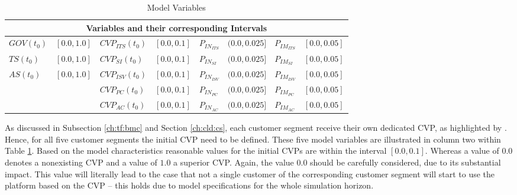 \begin{table}[t]
	\centering
	\begin{tabular}{llllllll}
		\toprule 
		\multicolumn{8}{c}{\footnotesize \textbf{Variables and their corresponding Intervals}} \\ \midrule
		\footnotesize $GOV(t_0)$ & \footnotesize $[0.0,1.0]$ & \footnotesize $CVP_{ITS}(t_0)$ & \footnotesize $[0.0,0.1]$ & \footnotesize $P_{IN_{ITS}}$ & \footnotesize $(0.0,0.025]$ & \footnotesize $P_{IM_{ITS}}$ & \footnotesize $[0.0,0.05]$ \\
		\footnotesize $TS(t_0)$ & \footnotesize $[0.0,1.0]$ & \footnotesize $CVP_{SI}(t_0)$ & \footnotesize $[0.0,0.1]$ & \footnotesize $P_{IN_{SI}}$ & \footnotesize $(0.0,0.025]$ & \footnotesize $P_{IM_{SI}}$ & \footnotesize $[0.0,0.05]$ \\
		\footnotesize $AS(t_0)$ & \footnotesize $[0.0,1.0]$ & \footnotesize $CVP_{ISV}(t_0)$ & \footnotesize $[0.0,0.1]$ & \footnotesize $P_{IN_{ISV}}$ & \footnotesize $(0.0,0.025]$ & \footnotesize $P_{IM_{ISV}}$ & \footnotesize $[0.0,0.05]$ \\
		& & \footnotesize $CVP_{PC}(t_0)$ & \footnotesize $[0.0,0.1]$ & \footnotesize $P_{IN_{PC}}$ & \footnotesize $(0.0,0.025]$ & \footnotesize $P_{IM_{PC}}$ & \footnotesize $[0.0,0.05]$ \\
		& & \footnotesize $CVP_{AC}(t_0)$ & \footnotesize $[0.0,0.1]$ & \footnotesize $P_{IN_{AC}}$ & \footnotesize $(0.0,0.025]$ & \footnotesize $P_{IM_{AC}}$ & \footnotesize $[0.0,0.05]$ \\ \bottomrule
	\end{tabular}
	\caption{Model Variables}
	\label{tab:mvar}
\end{table}

\setlength{\tabcolsep}{\originalTabcolsep}

As discussed in Subsection \ref{ch:tf:bmc} and Section \ref{ch:cld:cs}, each customer segment receive their own dedicated \ac{CVP}, as highlighted by \citet{Johnson2008}. Hence, for all five customer segments the initial \ac{CVP} need to be defined. These five model variables are illustrated in column two within Table \ref{tab:mvar}. Based on the model characteristics reasonable values for the initial \acp{CVP} are within the interval $[0.0,0.1]$. Whereas a value of $0.0$ denotes a nonexisting \ac{CVP} and a value of $1.0$ a superior \ac{CVP}. Again, the value $0.0$ should be carefully considered, due to its substantial impact. This value will literally lead to the case that not a single customer of the corresponding customer segment will start to use the platform based on the \ac{CVP} -- this holds due to model specifications for the whole simulation horizon.

